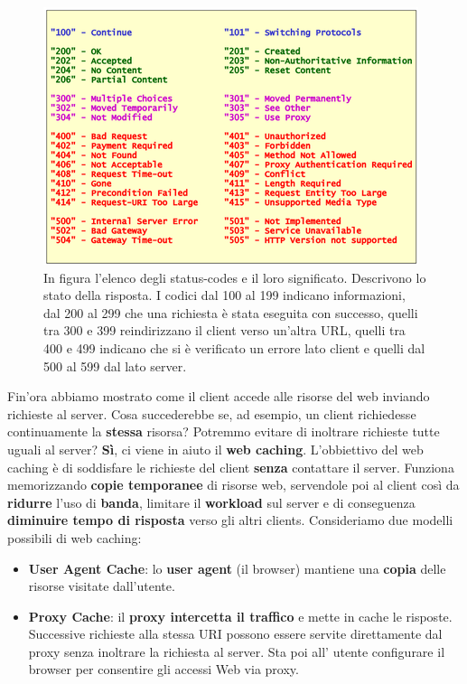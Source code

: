 \documentclass[11pt,a4paper,oneside]{book}
\theoremstyle{definition}
\begin{document}
\begin{figure}[!h]
	\includegraphics[scale=0.5]{Immagini/Stat_code.png}
	\centering
	\caption{In figura l'elenco degli status-codes e il loro significato. Descrivono lo stato della risposta. I codici dal 100 al 199 indicano informazioni, dal 200 al 299 che una richiesta è stata eseguita con successo, quelli tra 300 e 399 reindirizzano il client verso un'altra URL, quelli tra 400 e 499 indicano che si è verificato un errore lato client e quelli dal 500 al 599 dal lato server.}
\end{figure}

\pagebreak

Fin'ora abbiamo mostrato come il client accede alle risorse del web inviando richieste al server. Cosa succederebbe se, ad esempio, un client richiedesse continuamente la \textbf{stessa} risorsa? Potremmo evitare di inoltrare richieste tutte uguali al server? \textbf{Sì}, ci viene in aiuto il \textbf{web caching}. L'obbiettivo del web caching è di soddisfare le richieste del client \textbf{senza} contattare il server. Funziona memorizzando \textbf{copie temporanee} di risorse web, servendole poi al client così da \textbf{ridurre} l’uso di \textbf{banda}, limitare il \textbf{workload} sul server e di conseguenza \textbf{diminuire tempo di risposta} verso gli altri clients. Consideriamo due modelli possibili di web caching:
\begin{itemize}
	\item \textbf{User Agent Cache}: lo \textbf{user agent} (il browser) mantiene una \textbf{copia} delle risorse visitate dall’utente.
	\item \textbf{Proxy Cache}: il \textbf{proxy intercetta il traffico} e mette in cache le risposte. Successive richieste alla stessa URI possono essere servite direttamente dal proxy senza inoltrare la richiesta al server. Sta poi all' utente configurare il browser per consentire gli accessi Web via proxy.
\end{itemize}
\end{document}
